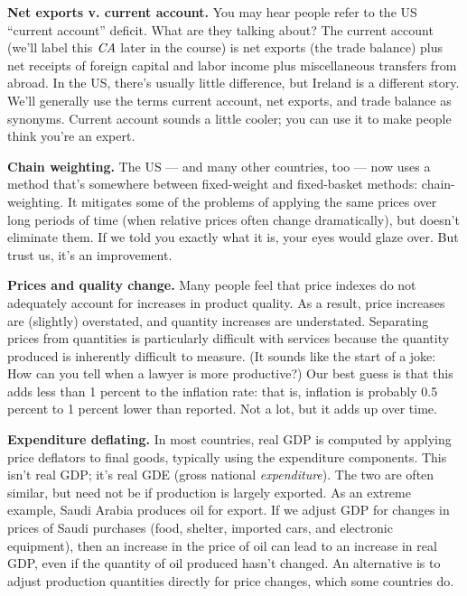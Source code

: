 \textbf{Net exports v. current account.} You may hear people refer
to the US ``current account'' deficit. What are they talking
about? The current account (we'll label this $\mbox{\it CA\/}$
later in the course) is net exports (the trade balance) plus net
receipts of foreign capital and labor income plus miscellaneous
transfers from abroad. In the US, there's usually little difference, but Ireland is a different story.  We'll generally use the terms
current account, net exports, and trade balance as synonyms.
Current account sounds a little cooler;
you can use it to make people think you're an expert.


\textbf{Chain weighting.}
The US --- and many other countries, too ---
now uses a method that's somewhere between fixed-weight and fixed-basket methods:  chain-weighting.
It mitigates some of the problems of applying the same prices over
long periods of time (when relative prices often change dramatically),
but doesn't eliminate them.
If we told you exactly what it is, your eyes would glaze over.
But trust us, it's an improvement.

\textbf{Prices and quality change.} Many people feel that price
indexes do not adequately account for increases in product
quality. As a result, price increases are (slightly) overstated,
and quantity increases are understated.
Separating prices from quantities is particularly
difficult with services because the quantity produced is inherently
difficult to measure. (It sounds like the start of a joke:  How
can you tell when a lawyer is more productive?)  Our best guess is
that this adds less than  1 percent to the inflation rate:  that is,
inflation is probably 0.5 percent to 1 percent lower than reported.
Not a lot, but it adds up over time.

\textbf{Expenditure deflating.}
In most countries, real GDP is computed by
applying price deflators to final goods, typically using the expenditure components.
This isn't real GDP; it's real GDE (gross national {\it expenditure\/}).  The two are often similar, but need not be if production is largely exported.
As an extreme example, Saudi Arabia produces oil for export.
If we adjust GDP for changes in prices of Saudi purchases
(food, shelter, imported cars, and electronic equipment),
then an increase in the price of oil can lead to an increase in real GDP,
even if the quantity of oil produced hasn't changed.
An alternative is to adjust production quantities directly for price changes,
which some countries do.

